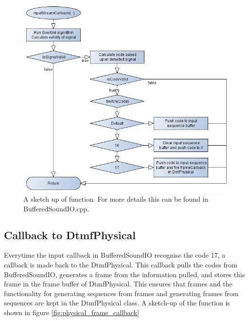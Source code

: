 		\begin{figure}[htb]
			\begin{center}
			\includegraphics[scale=0.7,trim=0 0 0 0]{content/graphics/physical/physical_input_callback.png}%
			\caption{A sketch up of  function. For more details this can be found in BufferedSoundIO.cpp.}
			\label{fig:physical_input_callback}
			\end{center}
		\end{figure}
		
	\subsection{Callback to DtmfPhysical}
	Everytime the input callback in BufferedSoundIO recognise the code 17, a callback is made back to the DtmfPhysical. This callback pulls the
	codes from BufferedSoundIO, generates a frame from the information pulled, and stores this frame in the frame buffer of DtmfPhysical. This ensures
	that frames and the functionality for generating sequences from frames and generating frames from sequences are kept in the DtmfPhysical class.
	A sketch-up of the function is shown in figure \ref{fig:physical_frame_callback}
	
